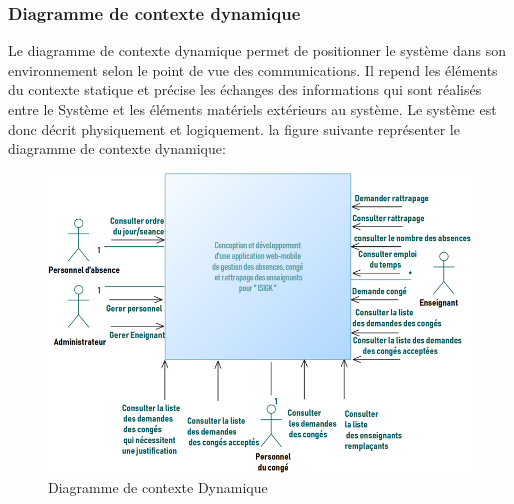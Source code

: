 \documentclass[12 pt]{report}
\begin{document}
\subsubsection{ Diagramme de contexte dynamique }
Le diagramme de contexte dynamique permet de positionner le système dans son environnement selon le point de vue des communications. Il repend les éléments du contexte statique et précise les échanges des informations qui sont réalisés entre le 
Système et les éléments matériels extérieurs au système. Le système est donc décrit physiquement et logiquement.
\newpage
la figure suivante représenter le diagramme de contexte dynamique:
\begin{figure}[h]
\begin{center}

\includegraphics[width= 16 cm ,height= 12 cm]{d.png}
\caption{ Diagramme de contexte Dynamique}
\end{center}

\end{figure}
\end{document}
